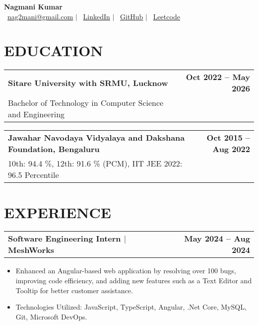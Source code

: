 \documentclass[a4paper,10pt]{article}
\begin{document}
\pagestyle{empty}

\begin{center}
    \textbf{\huge Nagmani Kumar} \\[5pt]
    \faEnvelope \, \href{mailto:nag2mani@gmail.com}{nag2mani@gmail.com} \hspace{2pt} $|$ \hspace{2pt}
    \faLinkedinSquare \, \href{https://www.linkedin.com/in/nag2mani/}{LinkedIn} \hspace{2pt} $|$ \hspace{2pt}
    \faGithub \, \href{https://github.com/nag2mani}{GitHub} \hspace{2pt} $|$ \hspace{2pt}
    \faCode \, \href{https://leetcode.com/nag2mani/}{Leetcode}
\end{center}

\section*{EDUCATION}
\noindent
\begin{tabularx}{\textwidth}{Xr}
\textbf{Sitare University with SRMU, Lucknow} & \textbf{Oct 2022 -- May 2026} \\
\textnormal{Bachelor of Technology in Computer Science and Engineering} & \\
\end{tabularx}

\vspace{5pt} %

\noindent
\begin{tabularx}{\textwidth}{Xr}
\textbf{Jawahar Navodaya Vidyalaya and Dakshana Foundation, Bengaluru} & \textbf{Oct 2015 -- Aug 2022} \\
\textnormal{10th: 94.4 \%, 12th: 91.6 \% (PCM), IIT JEE 2022: 96.5 Percentile} & \\
\end{tabularx}




\section*{EXPERIENCE}

\noindent
\begin{tabularx}{\textwidth}{Xr}
\textbf{Software Engineering Intern $|$ MeshWorks} & \textbf{May 2024 -- Aug 2024} \\
\end{tabularx}
\begin{itemize}[leftmargin=4em]
    \item Enhanced an Angular-based web application by resolving over 100 bugs, improving code efficiency, and adding new features such as a Text Editor and Tooltip for better customer assistance.
    \item Technologies Utilized: JavaScript, TypeScript, Angular, .Net Core, MySQL, Git, Microsoft DevOps.
\end{itemize}
\end{document}
